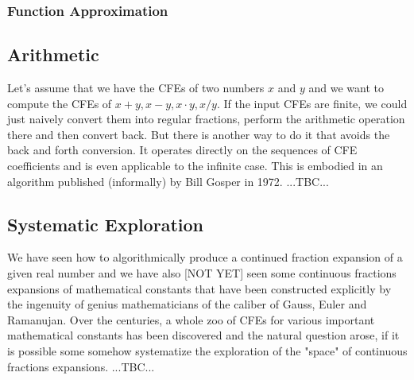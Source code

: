 



\subsubsection{Function Approximation}





\subsection{Arithmetic}
Let's assume that we have the CFEs of two numbers $x$ and $y$ and we want to compute the CFEs of $x + y, x - y, x \cdot y, x / y$. If the input CFEs are finite, we could just naively convert them into regular fractions, perform the arithmetic operation there and then convert back. But there is another way to do it that avoids the back and forth conversion. It operates directly on the sequences of CFE coefficients and is even applicable to the infinite case. This is embodied in an algorithm published (informally) by Bill Gosper in 1972. ...TBC...






\subsection{Systematic Exploration}
We have seen how to algorithmically produce a continued fraction expansion of a given real number and we have also [NOT YET] seen some continuous fractions expansions of mathematical constants that have been constructed explicitly by the ingenuity of genius mathematicians of the caliber of Gauss, Euler and Ramanujan. Over the centuries, a whole zoo of CFEs for various important mathematical constants has been discovered and the natural question arose, if it is possible some somehow systematize the exploration of the "space" of continuous fractions expansions. ...TBC...


